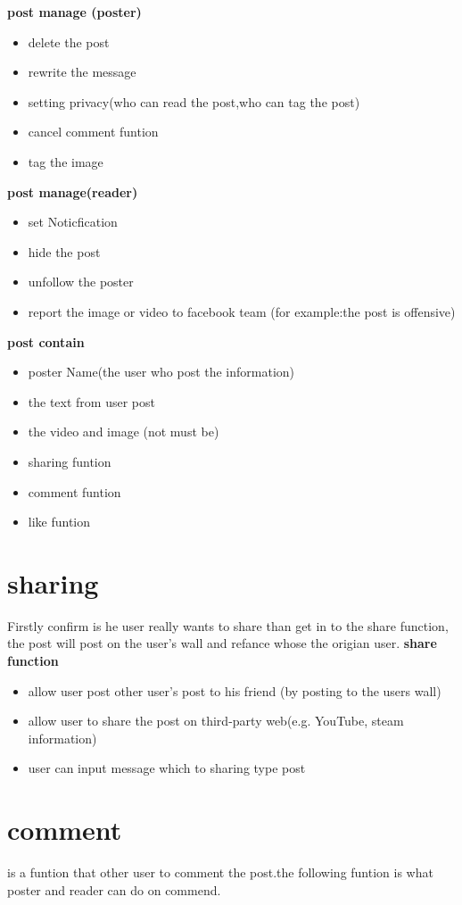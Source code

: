 \begin{itemize}
{\begin{itemize}
\begin{itemize}
\textbf{post manage (poster)}
\begin{itemize}
\item delete the post
\item rewrite the message
\item setting privacy(who can read the post,who can tag the post)
\item cancel comment funtion
\item tag the image 
\end{itemize}

\textbf{post manage(reader)}
\begin{itemize}
\item set Noticfication
\item hide the post 
\item unfollow the poster
\item report the image or video to facebook team (for example:the post is offensive)
\end{itemize}

\textbf{post contain}
\begin{itemize}
\item poster Name(the user who post the information)
\item the text from user post
\item the video and image (not must be)
\item sharing funtion
\item comment funtion
\item like funtion
\end{itemize}


\section{sharing}
  Firstly confirm is he user really wants to share than get in to the share function, the post will post on the user's wall and refance whose the origian user.
\textbf{share function}
\begin{itemize}
\item allow user post other user's post to his friend (by posting to the users wall)
\item allow user to share the post on third-party web(e.g. YouTube, steam information)
\item user can input message which to sharing type post 
\end{itemize}



\section{comment}
is a funtion that other user to comment the post.the following funtion is what poster and reader can do on commend.


\end{itemize}
\end{itemize}}
\end{itemize}
